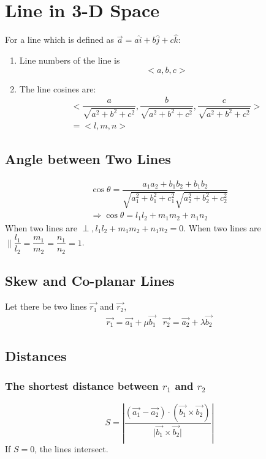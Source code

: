 \chapter{Line in 3-D Space}
For a line which is defined as $\vec{a}=a\hat{i}+b\hat{j}+c\hat{k}$:
\begin{enumerate}
	\item Line numbers of the line is
	\begin{equation}
		<a,b,c>
	\end{equation}
	\item The line cosines are:
	\begin{align}
		<\dfrac{a}{\sqrt{a^2+b^2+c^2}},\dfrac{b}{\sqrt{a^2+b^2+c^2}},\dfrac{c}{\sqrt{a^2+b^2+c^2}}>\\
		=<l,m,n>
	\end{align}
\end{enumerate}


\section{Angle between Two Lines}
\begin{align}
	\cos \theta	=\dfrac{a_1a_2+b_1b_2+b_1b_2}{\sqrt{a_1^2+b_1^2+c_1^2}\sqrt{a_2^2+b_2^2+c_2^2}}\\
	\Rightarrow \cos \theta= l_1l_2+m_1m_2+n_1n_2
\end{align}
When two lines are $\perp, l_1l_2+m_1m_2+n_1n_2=0$.
When two lines are $\parallel \dfrac{l_1}{l_2}=\dfrac{m_1}{m_2}=\dfrac{n_1}{n_2}=1$.


\section{Skew and Co-planar Lines}
Let there be two lines $\vec{r_1}$ and $\vec{r_2}$,
\begin{equation}
	\begin{split}
		\vec{r_1}=\vec{a_1}+\mu \vec{b_1} & \vec{r_2}=\vec{a_2}+\lambda \vec{b_2}
	\end{split}
\end{equation}


\section{Distances}
\subsection{The shortest distance between $r_1$ and $r_2$}
\begin{equation}
	S=\left\lvert \dfrac{(\vec{a_1}-\vec{a_2})\cdot (\vec{b_1}\times\vec{b_2})}{\lvert \vec{b_1}\times\vec{b_2} \rvert}\right\rvert
\end{equation}
If $S=0$, the lines intersect.

